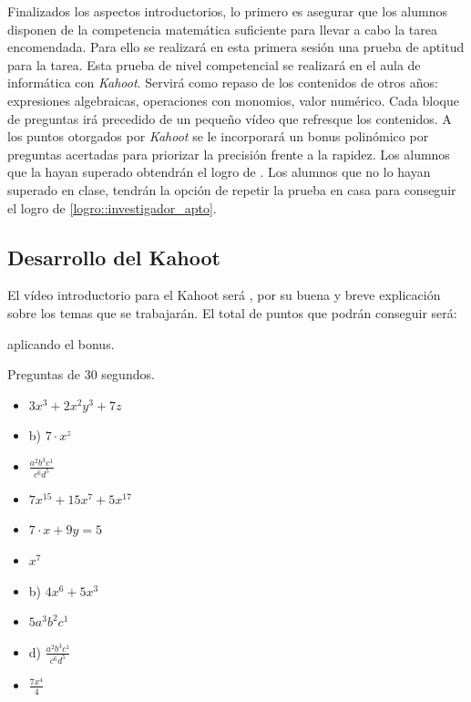 Finalizados los aspectos introductorios, lo primero es asegurar que los alumnos disponen de la competencia matemática suficiente para llevar a cabo la tarea encomendada.
%
Para ello se realizará en esta primera sesión una prueba de aptitud para la tarea.
%
Esta prueba de nivel competencial se realizará en el aula de informática con \textit{Kahoot}.
%
Servirá como repaso de los contenidos de otros años: expresiones algebraicas, operaciones con monomios, valor numérico.
%
Cada bloque de preguntas irá precedido de un pequeño vídeo que refresque los contenidos.
%
A los puntos otorgados por \textit{Kahoot} se le incorporará un bonus polinómico por preguntas acertadas para priorizar la precisión frente a la rapidez.
%
Los alumnos que la hayan superado obtendrán el logro de .
%
Los alumnos que no lo hayan superado en clase, tendrán la opción de repetir la prueba en casa para conseguir el logro de \ref{logro::investigador_apto}.


\subsection{Desarrollo del Kahoot}

El vídeo introductorio para el Kahoot será \cite{VideoKahootSes1}, por su buena y breve explicación sobre los temas que se trabajarán.
%
%
El total de puntos que podrán conseguir será: 

aplicando el bonus.

\newbloq Preguntas de 30 segundos.


\begin{itemize}
\item {} $3x^3+2x^2y^3 + 7z$
\item b) $7·x^z$
\item {} $\frac{a^2b^3c^1}{c^6d^5}$
\item {} $7x^{15} + 15x^7 + 5x^{17}$
\item {} $7·x+9y = 5$
\end{itemize}



\begin{itemize}
\item {} $x^7$
\item b) $4x^6+5x^3$
\item {} $5a^3b^2c^1$
\item d) $\frac{a^2b^3c^1}{c^6d^5}$
\item {} $\frac{7x^4}{4}$
\end{itemize}


